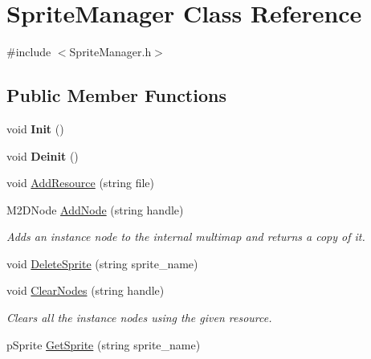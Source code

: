 \hypertarget{classSpriteManager}{
\section{SpriteManager Class Reference}
\label{classSpriteManager}
}


{\ttfamily \#include $<$SpriteManager.h$>$}\subsection*{Public Member Functions}
\begin{DoxyCompactItemize}
\item 
\hypertarget{classSpriteManager_a82941ce284548c762f250220ea58f43c}{
void {\bfseries Init} ()}
\label{classSpriteManager_a82941ce284548c762f250220ea58f43c}

\item 
\hypertarget{classSpriteManager_abd70497163fb7b0d9cf7bc84ad7e4add}{
void {\bfseries Deinit} ()}
\label{classSpriteManager_abd70497163fb7b0d9cf7bc84ad7e4add}

\item 
void \hyperlink{classSpriteManager_a62d64bc26902245b617f7e738ce1fe1b}{AddResource} (string file)
\item 
\hypertarget{classSpriteManager_a35b9196b2e3d675cb874b48458fc729d}{
M2DNode \hyperlink{classSpriteManager_a35b9196b2e3d675cb874b48458fc729d}{AddNode} (string handle)}
\label{classSpriteManager_a35b9196b2e3d675cb874b48458fc729d}

\begin{DoxyCompactList}\small\item\em Adds an instance node to the internal multimap and returns a copy of it. \item\end{DoxyCompactList}\item 
void \hyperlink{classSpriteManager_a8495b0a9a6de0c8bdd0fe60f46d9e314}{DeleteSprite} (string sprite\_\-name)
\item 
\hypertarget{classSpriteManager_a55a2a727022449bfaaa2a680d4431564}{
void \hyperlink{classSpriteManager_a55a2a727022449bfaaa2a680d4431564}{ClearNodes} (string handle)}
\label{classSpriteManager_a55a2a727022449bfaaa2a680d4431564}

\begin{DoxyCompactList}\small\item\em Clears all the instance nodes using the given resource. \item\end{DoxyCompactList}\item 
\hypertarget{classSpriteManager_af9a3d082241930a426e06002c2351a16}{
pSprite \hyperlink{classSpriteManager_af9a3d082241930a426e06002c2351a16}{GetSprite} (string sprite\_\-name)}
\label{classSpriteManager_af9a3d082241930a426e06002c2351a16}


\end{DoxyCompactItemize}
